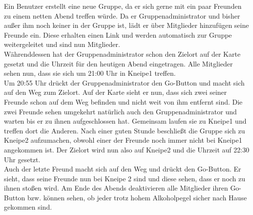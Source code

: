      Ein Benutzer erstellt eine neue Gruppe, da er sich gerne mit ein paar Freunden zu einem netten Abend treffen würde. Da er Gruppenadministrator und bisher außer ihm noch keiner in der Gruppe ist, lädt er über Mitglieder hinzufügen seine Freunde ein. Diese erhalten einen Link und werden automatisch zur Gruppe weitergeleitet und sind nun Mitglieder. \\
     Währenddessen hat der Gruppenadministrator schon den Zielort auf der Karte gesetzt und die Uhrzeit für den heutigen Abend eingetragen. Alle Mitglieder sehen nun, dass sie sich um 21:00 Uhr in Kneipe1 treffen. \\
     Um 20:55 Uhr drückt der Gruppenadministrator den Go-Button und macht sich auf den Weg zum Zielort. Auf der Karte sieht er nun, dass sich zwei seiner Freunde schon auf dem Weg befinden und nicht weit von ihm entfernt sind. Die zwei Freunde sehen umgekehrt natürlich auch den Gruppenadministrator und warten bis er zu ihnen aufgeschlossen hat. Gemeinsam laufen sie zu Kneipe1 und treffen dort die Anderen. Nach einer guten Stunde beschließt die Gruppe sich zu Kneipe2 aufzumachen, obwohl einer der Freunde noch immer nicht bei Kneipe1 angekommen ist. 
     Der Zielort wird nun also auf Kneipe2 und die Uhrzeit auf 22:30 Uhr gesetzt. \\
     Auch der letzte Freund macht sich auf den Weg und drückt den Go-Button. Er sieht, dass seine Freunde nun bei Kneipe 2 sind und diese sehen, dass er noch zu ihnen stoßen wird.
     Am Ende des Abends deaktivieren alle Mitglieder ihren Go-Button bzw. können sehen, ob jeder trotz hohem Alkoholpegel sicher nach Hause gekommen sind.
     
     
     
